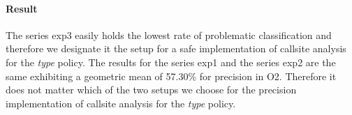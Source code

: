 \paragraph{Result} The series exp3 easily holds the lowest rate of problematic classification and therefore we designate it the setup for a safe implementation of callsite analysis for the \textit{type} policy. The results for the series exp1 and the series exp2 are the same exhibiting a geometric mean of 57.30\% for precision in O2. Therefore it does not matter which of the two setups we choose for the precision implementation of callsite analysis for the \textit{type} policy.


\newpage
\begin{table}[!htbp]
\centering
{}
\end{table}
